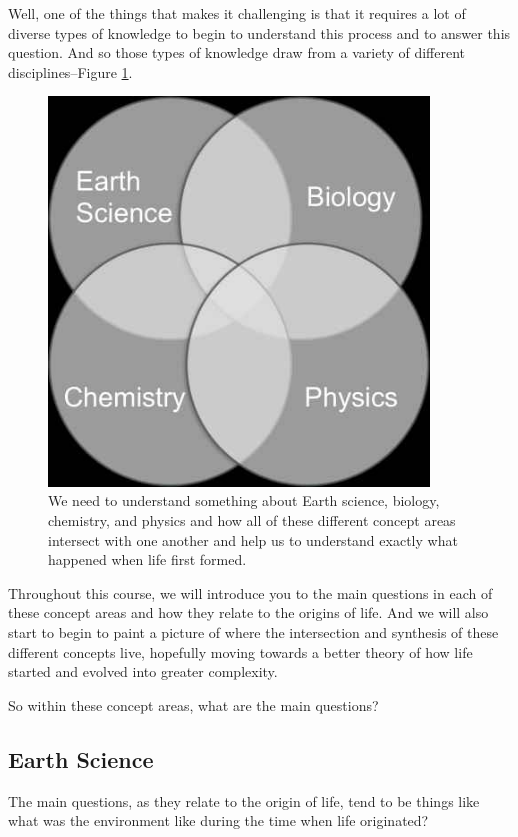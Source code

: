 \documentclass[]{article}
\begin{document}
Well, one of the things that makes it
challenging is that it requires
a lot of diverse types of knowledge to
begin to understand
this process and to answer this question.
And so those types of knowledge draw from
a variety of different disciplines--Figure \ref{fig:tradional:disciplines}.
\begin{figure}[H]
	\begin{center}
		\caption[Traditional disciplines needed for Origin of Life]{We need to understand something about Earth science, biology, chemistry, and physics and how all of these different concept areas intersect with one another and help us to understand exactly what happened when life first formed.}\label{fig:tradional:disciplines}
		\includegraphics[width=0.9\textwidth]{4mainAreas}
	\end{center}
\end{figure}

Throughout this course, we will introduce you to the main questions in each of these concept areas and how they relate to the origins of life. And we will also start to begin to paint a picture of where the intersection and synthesis of these different concepts live, hopefully moving towards a better theory of how life started and evolved into
greater complexity.

So within these concept areas, what are the main questions? 

\subsection{Earth Science}
The main questions, as they relate to the origin of life, tend to be things like what was the environment like during the time when life originated?
\end{document}
